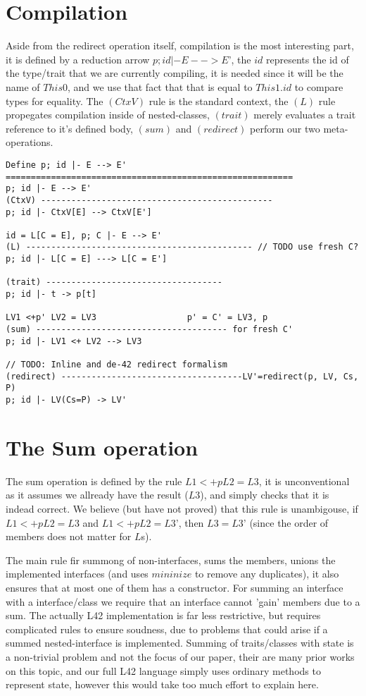 \section{Compilation}

Aside from the redirect operation itself, compilation is the most interesting part, it is defined by a reduction arrow $p; id |- E --> E’$, the $id$ represents the id of the type/trait that we are currently compiling, it is needed since it will be the name of $This0$, and we use that fact that that is equal to $This1.id$ to compare types for equality.
The $(CtxV)$ rule is the standard context, the $(L)$ rule propegates compilation inside of nested-classes, $(trait)$ merely evaluates a trait reference to it’s defined body, $(sum)$ and $(redirect)$ perform our two meta-operations.

\begin{verbatim}
Define p; id |- E --> E'
=========================================================
p; id |- E --> E'
(CtxV) ----------------------------------------------
p; id |- CtxV[E] --> CtxV[E']

id = L[C = E], p; C |- E --> E'
(L) --------------------------------------------- // TODO use fresh C?
p; id |- L[C = E] ---> L[C = E']

(trait) -----------------------------------
p; id |- t -> p[t]

LV1 <+p' LV2 = LV3                  p' = C' = LV3, p
(sum) -------------------------------------- for fresh C'
p; id |- LV1 <+ LV2 --> LV3

// TODO: Inline and de-42 redirect formalism
(redirect) ------------------------------------LV'=redirect(p, LV, Cs, P)
p; id |- LV(Cs=P) -> LV'
\end{verbatim}

\section{The Sum operation}

The sum operation is defined by the rule $L1 <+p L2 = L3$, it is unconventional as it assumes we allready have the result ($L3$), and simply checks that it is indead correct.
We believe (but have not proved) that this rule is unambigouse, if $L1 <+ p L2 = L3$ and $L1 <+ p L2 = L3’$, then $L3 = L3’$ (since the order of members does not matter for $L$s).

The main rule fir summong of non-interfaces, sums the members, unions the implemented interfaces (and uses $mininize$ to remove any duplicates), it also ensures that at most one of them has a constructor.
For summing an interface with a interface/class we require that an interface cannot ’gain’ members due to a sum. The actually L42 implementation is far less restrictive, but requires complicated rules to ensure soudness, due to problems that could arise if a summed nested-interface is implemented.
Summing of traits/classes with state is a non-trivial problem and not the focus of our paper, their are many prior works on this topic, and our full L42 language simply uses ordinary methods to represent state, however this would take too much effort to explain here.


